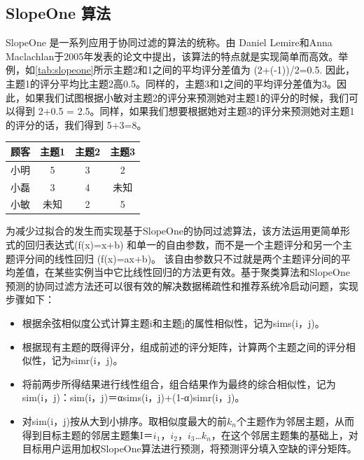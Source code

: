		\subsection{SlopeOne 算法}
		SlopeOne 是一系列应用于协同过滤的算法的统称。由 Daniel Lemire和Anna Maclachlan于2005年发表的论文中提出，该算法的特点就是实现简单而高效。举例，如\autoref{tab:slopeone}所示主题2和1之间的平均评分差值为 (2+(-1))/2=0.5. 因此，主题1的评分平均比主题2高0.5。同样的，主题3和1之间的平均评分差值为3。因此，如果我们试图根据小敏对主题2的评分来预测她对主题1的评分的时候，我们可以得到 2+0.5 = 2.5。同样，如果我们想要根据她对主题3的评分来预测她对主题1的评分的话，我们得到 5+3=8。
		
		\begin{table}[htp]
		\centering
		\label{tab:slopeone}
		\begin{tabular}{ |c|c|c|c| } \hline
		 顾客 & 主题1 & 主题2 & 主题3\\ \hline
		 小明 & 5 & 3 & 2 \\ \hline
		 小磊 & 3 & 4 & 未知 \\ \hline
		 小敏 & 未知 & 2 & 5 \\ \hline
		\end{tabular}
		\end{table}

		为减少过拟合的发生而实现基于SlopeOne的协同过滤算法，该方法运用更简单形式的回归表达式(f(x)=x+b) 和单一的自由参数，而不是一个主题评分和另一个主题评分间的线性回归 (f(x)=ax+b)。 该自由参数只不过就是两个主题评分间的平均差值，在某些实例当中它比线性回归的方法更有效。基于聚类算法和SlopeOne预测的协同过滤方法还可以很有效的解决数据稀疏性和推荐系统冷启动问题，实现步骤如下：
		\begin{itemize}
		\item 根据余弦相似度公式计算主题i和主题j的属性相似性，记为sims(i，j)。
		\item 根据现有主题的既得评分，组成前述的评分矩阵，计算两个主题之间的评分相似性，记为simr(i，j)。
		\item 将前两步所得结果进行线性组合，组合结果作为最终的综合相似性，记为sim(i，j)：sim(i，j)＝αsims(i，j)+(1-α)simr(i，j)。
		\item 对sim(i，j)按从大到小排序。取相似度最大的前$k_n$个主题作为邻居主题，从而得到目标主题的邻居主题集I＝{$i_1$，$i_2$，$i_3$…$k_n$}，在这个邻居主题集的基础上，对目标用户运用加权SlopeOne算法进行预测，将预测评分填入空缺的评分矩阵。
		\end{itemize}

